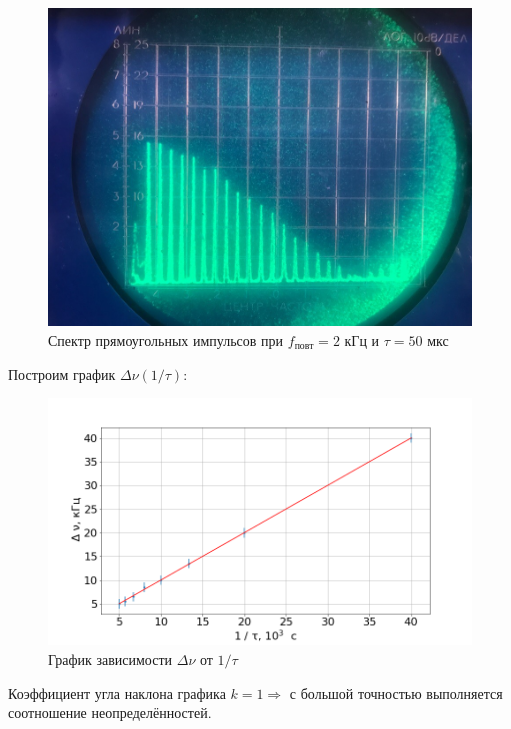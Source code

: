 \documentclass[a4paper, fontsize=14pt]{article}
\begin{document}
\begin{figure}[H]
\center
\includegraphics[scale=0.3]{3.jpg}
\caption{Спектр прямоугольных импульсов при $f_\text{повт} = 2$ кГц и $\tau = 50$ мкс}
\end{figure}
Построим график $\Delta \nu (1 / \tau)$:
\begin{figure}[H]
\center
\includegraphics[scale=0.4]{gra1.png}
\caption{График зависимости $\Delta \nu$ от $1 / \tau$}
\end{figure}
Коэффициент угла наклона графика $k = 1 \Rightarrow$ с большой точностью выполняется соотношение неопределённостей.
\end{document}
